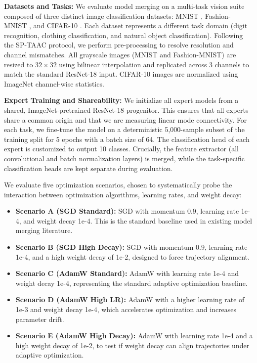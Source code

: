 \documentclass{article}
\theoremstyle{plain}
\theoremstyle{definition}
\theoremstyle{remark}
\begin{document}
\textbf{Datasets and Tasks:} We evaluate model merging on a multi-task vision suite composed of three distinct image classification datasets: MNIST \cite{lecun1998gradient}, Fashion-MNIST \cite{xiao2017fashion}, and CIFAR-10 \cite{krizhevsky2009learning}. Each dataset represents a different task domain (digit recognition, clothing classification, and natural object classification). Following the SP-TAAC \cite{sptaac2026} protocol, we perform pre-processing to resolve resolution and channel mismatches. All grayscale images (MNIST and Fashion-MNIST) are resized to $32 \times 32$ using bilinear interpolation and replicated across 3 channels to match the standard ResNet-18 input. CIFAR-10 images are normalized using ImageNet channel-wise statistics.

\textbf{Expert Training and Shareability:} We initialize all expert models from a shared, ImageNet-pretrained \cite{deng2009imagenet} ResNet-18 \cite{he2016deep} progenitor. This ensures that all experts share a common origin and that we are measuring linear mode connectivity. For each task, we fine-tune the model on a deterministic 5,000-sample subset of the training split for 5 epochs with a batch size of 64. The classification head of each expert is customized to output 10 classes. Crucially, the feature extractor (all convolutional and batch normalization layers) is merged, while the task-specific classification heads are kept separate during evaluation.

We evaluate five optimization scenarios, chosen to systematically probe the interaction between optimization algorithms, learning rates, and weight decay:
\begin{itemize}
    \item \textbf{Scenario A (SGD Standard):} SGD with momentum 0.9, learning rate 1e-4, and weight decay 1e-4. This is the standard baseline used in existing model merging literature.
    \item \textbf{Scenario B (SGD High Decay):} SGD with momentum 0.9, learning rate 1e-4, and a high weight decay of 1e-2, designed to force trajectory alignment.
    \item \textbf{Scenario C (AdamW Standard):} AdamW with learning rate 1e-4 and weight decay 1e-4, representing the standard adaptive optimization baseline.
    \item \textbf{Scenario D (AdamW High LR):} AdamW with a higher learning rate of 1e-3 and weight decay 1e-4, which accelerates optimization and increases parameter drift.
    \item \textbf{Scenario E (AdamW High Decay):} AdamW with learning rate 1e-4 and a high weight decay of 1e-2, to test if weight decay can align trajectories under adaptive optimization.
\end{itemize}
\end{document}
